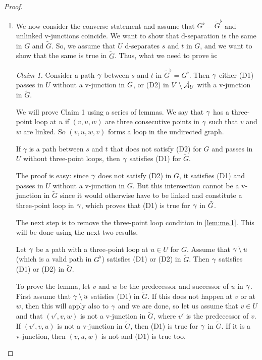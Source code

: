 \begin{proof}
\begin{enumerate}[label={\it Step \arabic*.}]
\begin{enumerate}[label={\it Step 2.\arabic*.}]
We
know that $t\not \in U$, because it cannot be both a child and an
ancestor of $\{s, u\}$ in $G$ (this would induce a loop). The path
$(s,t,u)$ links $s$ and $u$ and does not pass in $U$, which is
only possible (since $U$ d-separates $s$ and $t$ in $\tilde G$) if it passes in
$V-\tilde \CA_U$ at a v-junction: so $(s,t,u)$ is a v-junction in
$\tilde G$, which is what we wanted to prove.
\end{enumerate}


\item We now consider the converse statement and assume that $G^\flat = \tilde G^\flat$
and unlinked v-junctions coincide. We want to show that d-separation
is the same in $G$ and $\tilde G$. So, we assume that $U$ d-separates $s$ and
$t$ in $G$, and we want to show that the same is true in $\tilde
G$. Thus, what we need to prove is:

{\em Claim 1.} Consider a path $\gamma$ between $s$ and $t$ in $\tilde
G^\flat= G^\flat$. Then $\gamma$ either  (D1)
passes in $U$ without a v-junction in ${\tilde{G}}$, or (D2) in $V\setminus
\tilde{{\mathcal A}}_U$ with a v-junction in $\tilde G$. 

We will prove Claim 1 using a series of lemmas. We say that $\gamma$ has a three-point loop at
$u$ if $(v, u, w)$ are three consecutive points in $\gamma$ such that
$v$ and $w$ are linked. So $(v, u, w, v)$ forms a loop in the
undirected graph.

\begin{lemma}
\label{lem:me.1}
If
$\gamma$ is a path between $s$ and $t$ that does not satisfy (D2) for $G$
and passes in $U$ without three-point loops, then $\gamma$ satisfies
(D1) for $\tilde G$. 
\end{lemma}
The proof is easy: since $\gamma$ does not satisfy (D2) in $G$,
it satisfies (D1) and passes in $U$ without a v-junction in
$G$. But this intersection cannot be a v-junction in $\tilde G$
since it would otherwise have to be linked and constitute a three-point
loop in $\gamma$, which proves that (D1) is true for $\gamma$ in ${\tilde{G}}$.

The next step is to remove the three-point loop condition in 
\cref{lem:me.1}. This will be done using the next two results.
\begin{lemma}
\label{lem:me.2}
Let $\gamma$ be a path with a three-point loop at
$u\in U$ for $G$. Assume that $\gamma\setminus u$ (which is a valid path in
$G^\flat$) satisfies (D1) or (D2) in
$\tilde G$. Then $\gamma$ satisfies (D1) or (D2) in $\tilde G$.
\end{lemma}
To prove the lemma, let $v$ and $w$ be the predecessor and
successor of $u$ in $\gamma$. First assume that $\gamma\setminus u$ satisfies (D1) in
$\tilde G$. If
this does not happen at $v$ or at $w$, then this will apply also to
$\gamma$ and we are done, so let us assume that $v\in U$ and that $(v', v,w)$ is not a
v-junction in $\tilde G$, where $v'$ is the predecessor of $v$.  If $(v',v,u)$ is
not a v-junction in $\tilde G$, then (D1) is true for $\gamma$ in $\tilde
G$. If it is
a v-junction, then $(v,u,w)$ is not and (D1) is true too.


\end{enumerate}
\end{proof}
